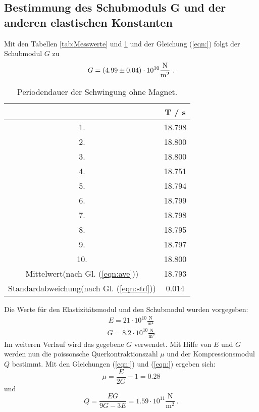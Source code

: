 \subsection{Bestimmung des Schubmoduls G und der anderen elastischen Konstanten}
Mit den Tabellen \ref{tab:Messwerte} und \ref{tab:Periodendauer1} und der Gleichung (\ref{eqn:}) folgt der Schubmodul $G$ zu
\begin{align*}
  G = (\num{4.99 +- 0.04}) \cdot 10^{10} \frac{\text{N}}{\text{m}^2} \ .
\end{align*}

\begin{table}[H] %
  \centering
  \begin{tabular}{c c}
    \toprule
    & T / s \\
    \midrule
    1. & 18.798 \\
    2. & 18.800 \\
    3. & 18.800 \\
    4. & 18.751 \\
    5. & 18.794 \\
    6. & 18.799 \\
    7. & 18.798 \\
    8. & 18.795 \\
    9. & 18.797 \\
    10.& 18.800 \\
    \bottomrule
    Mittelwert(nach Gl. (\ref{eqn:ave})) & 18.793 \\
    Standardabweichung(nach Gl. (\ref{eqn:std})) & 0.014 \\
    \bottomrule
  \end{tabular}
  \caption{Periodendauer der Schwingung ohne Magnet.}
  \label{tab:Periodendauer1}
\end{table}

Die Werte für den Elastizitätsmodul und den Schubmodul wurden vorgegeben:
\begin{align*}
  E = 21 \cdot 10^{10} \frac{\text{N}}{\text{m}^2}
\end{align*}
\begin{align*}
  G = 8.2 \cdot 10^{10} \frac{\text{N}}{\text{m}^2}
\end{align*}
Im weiteren Verlauf wird das gegebene $G$ verwendet. Mit Hilfe von $E$ und $G$ werden nun die poissonsche Querkontraktionszahl $\mu$ und der Kompressionsmodul $Q$ bestimmt. Mit den Gleichungen (\ref{eqn:}) und (\ref{eqn:}) ergeben sich:
\begin{equation}
  \mu = \frac{E}{2G} - 1 = 0.28
\end{equation}
und
\begin{equation}
  Q = \frac{EG}{9G - 3E} = 1.59 \cdot 10^{11} \frac{\text{N}}{\text{m}^2} \ .
\end{equation}

